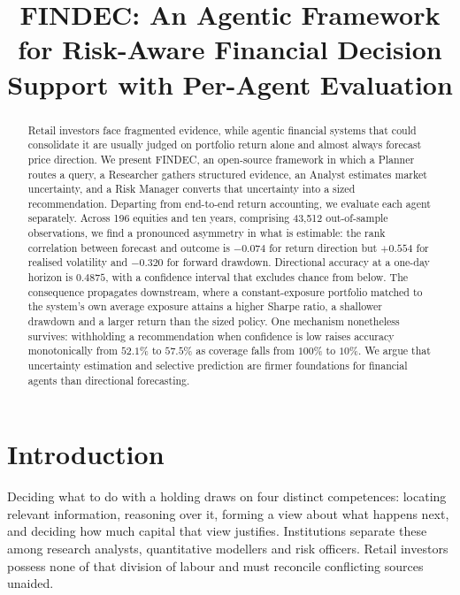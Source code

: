 \documentclass[conference]{IEEEtran}
\begin{document}
\title{FINDEC: An Agentic Framework for Risk-Aware Financial Decision
Support with Per-Agent Evaluation}

\author{
}

\maketitle

\begin{abstract}
Retail investors face fragmented evidence, while agentic financial systems
that could consolidate it are usually judged on portfolio return alone and
almost always forecast price direction. We present FINDEC, an open-source
framework in which a Planner routes a query, a Researcher gathers structured
evidence, an Analyst estimates market uncertainty, and a Risk Manager
converts that uncertainty into a sized recommendation. Departing from
end-to-end return accounting, we evaluate each agent separately. Across 196
equities and ten years, comprising 43{,}512 out-of-sample observations, we
find a pronounced asymmetry in what is estimable: the rank correlation
between forecast and outcome is $-0.074$ for return direction but $+0.554$
for realised volatility and $-0.320$ for forward drawdown. Directional
accuracy at a one-day horizon is $0.4875$, with a confidence interval that
excludes chance from below. The consequence propagates downstream, where a
constant-exposure portfolio matched to the system's own average exposure
attains a higher Sharpe ratio, a shallower drawdown and a larger return than
the sized policy. One mechanism nonetheless survives: withholding a
recommendation when confidence is low raises accuracy monotonically from
$52.1\%$ to $57.5\%$ as coverage falls from $100\%$ to $10\%$. We argue that
uncertainty estimation and selective prediction are firmer foundations for
financial agents than directional forecasting.
\end{abstract}

\section{Introduction}
\label{sec:intro}
Deciding what to do with a holding draws on four distinct competences:
locating relevant information, reasoning over it, forming a view about what
happens next, and deciding how much capital that view justifies. Institutions
separate these among research analysts, quantitative modellers and risk
officers. Retail investors possess none of that division of labour and must
reconcile conflicting sources unaided.
\end{document}
